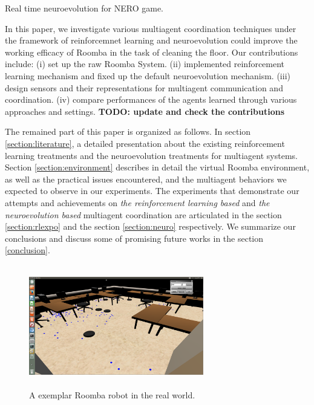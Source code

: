 \documentclass[conference]{IEEEtran}
\begin{document}
\cite{stanley2005real} Real time neuroevolution for NERO game. 

In this paper, we
investigate various multiagent coordination techniques under the framework of
reinforcemnet learning and neuroevolution could improve the working efficacy
of Roomba in the task of cleaning the floor. 
Our contributions include: 
(i) set up the raw Roomba System. 
(ii) implemented reinforcement learning mechanism and fixed up the default
neuroevolution mechanism. 
(iii) design sensors and their representations for multiagent
communication and coordination. 
(iv) compare performances of the agents learned through various approaches and
settings.
\textbf{TODO: update and check the contributions}

The remained part of this paper is organized as follows. 
In section \ref{section:literature}, a detailed presentation about the
existing  reinforcement learning treatments and the neuroevolution treatments
for multiagent systems.  
Section \ref{section:environment} describes in detail the virtual Roomba
environment, as well as the practical issues encountered, and the multiagent
behaviors we expected to observe in our experiments.  
The experiments that demonstrate our attempts and achievements on 
\textit{the reinforcement learning based} and \textit{the neuroevolution based}
multiagent coordination are articulated in the section \ref{section:rlexpo}
and the section \ref{section:neuro} respectively.  
We summarize our conclusions and discuss some of promising future works in the
section \ref{conclusion}. 


\begin{figure}[!t]
\centering
\includegraphics[width=3in,height=2.1in]{./figures/roombas/roomba3.png}
\caption{A exemplar Roomba robot in the real world.}
\label{roomba:world}
\end{figure}
\end{document}
